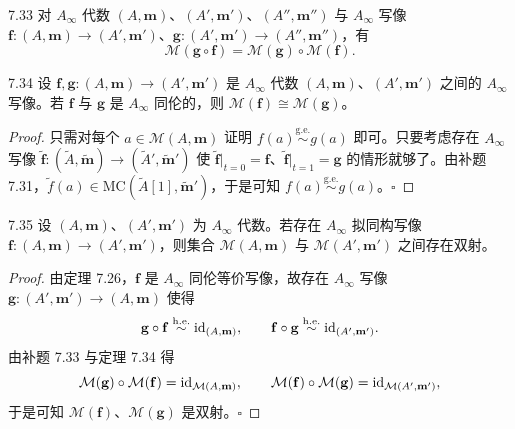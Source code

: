 \begin{proposition}{7.33}
对 $A_\infty$ 代数 $(A,\mathbf m)$、$(A',\mathbf m')$、$(A'',\mathbf m'')$ 与 $A_\infty$ 写像 $\mathbf f\colon(A,\mathbf m)\to(A',\mathbf m')$、$\mathbf g\colon(A',\mathbf m')\to(A'',\mathbf m'')$，有
\[
  \mathcal M(\mathbf g\circ\mathbf f)=\mathcal M(\mathbf g)\circ\mathcal M(\mathbf f).
\]
\end{proposition}

\begin{theorem}{7.34}
设 $\mathbf f,\mathbf g\colon(A,\mathbf m)\to(A',\mathbf m')$ 是 $A_\infty$ 代数 $(A,\mathbf m)$、$(A',\mathbf m')$ 之间的 $A_\infty$ 写像。若 $\mathbf f$ 与 $\mathbf g$ 是 $A_\infty$ 同伦的，则 $\mathcal M(\mathbf f)\cong\mathcal M(\mathbf g)$。
\end{theorem}

\begin{proof}
只需对每个 $a\in\mathcal M(A,\mathbf m)$ 证明 $f(a)\overset{\mathrm{g.e.}}{\sim}g(a)$ 即可。只要考虑存在 $A_\infty$ 写像 $\tilde{\mathbf f}\colon(\tilde A,\tilde{\mathbf m})\to(\tilde A',\tilde{\mathbf m}')$ 使 $\tilde{\mathbf f}|_{t=0}=\mathbf f$、$\tilde{\mathbf f}|_{t=1}=\mathbf g$ 的情形就够了。由补题 7.31，$\tilde f(a)\in\mathrm{MC}(\tilde A[1],\tilde{\mathbf m}')$，于是可知 $f(a)\overset{\mathrm{g.e.}}{\sim}g(a)$。\hfill$\square$
\end{proof}

\begin{corollary}{7.35}
设 $(A,\mathbf m)$、$(A',\mathbf m')$ 为 $A_\infty$ 代数。若存在 $A_\infty$ 拟同构写像 $\mathbf f\colon(A,\mathbf m)\to(A',\mathbf m')$，则集合 $\mathcal M(A,\mathbf m)$ 与 $\mathcal M(A',\mathbf m')$ 之间存在双射。
\end{corollary}

\begin{proof}
由定理 7.26，$\mathbf f$ 是 $A_\infty$ 同伦等价写像，故存在 $A_\infty$ 写像 $\mathbf g\colon(A',\mathbf m')\to(A,\mathbf m)$ 使得
\[
  \mathbf g\circ\mathbf f\overset{\mathrm{h.e.}}{\sim}\mathrm{id}_{(A,\mathbf m)},\qquad \mathbf f\circ\mathbf g\overset{\mathrm{h.e.}}{\sim}\mathrm{id}_{(A',\mathbf m')}.
\]
由补题 7.33 与定理 7.34 得
\[
  \mathcal M(\mathbf g)\circ\mathcal M(\mathbf f)=\mathrm{id}_{\mathcal M(A,\mathbf m)},\qquad \mathcal M(\mathbf f)\circ\mathcal M(\mathbf g)=\mathrm{id}_{\mathcal M(A',\mathbf m')},
\]
于是可知 $\mathcal M(\mathbf f)$、$\mathcal M(\mathbf g)$ 是双射。\hfill$\square$
\end{proof}

